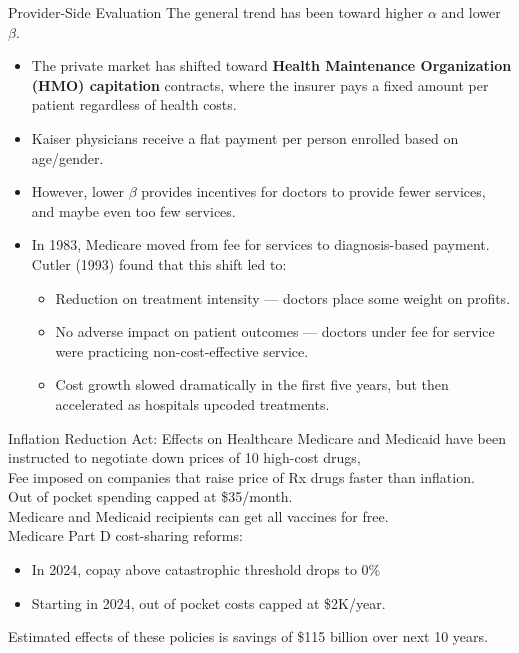\documentclass[8pt]{extarticle}
\begin{document}
\begin{problem}{Provider-Side Evaluation}
    The general trend has been toward higher $\alpha$ and lower $\beta$.
    \begin{itemize}
      \item The private market has shifted toward \textbf{Health Maintenance Organization (HMO) capitation} contracts, where the insurer pays a fixed amount per patient regardless of health costs.
      \item Kaiser physicians receive a flat payment per person enrolled based on age/gender.
      \item However, lower $\beta$ provides incentives for doctors to provide fewer services, and maybe even too few services.
      \item In 1983, Medicare moved from fee for services to diagnosis-based payment. Cutler (1993) found that this shift led to:
        \begin{itemize}
          \item Reduction on treatment intensity --- doctors place some weight on profits.
          \item No adverse impact on patient outcomes --- doctors under fee for service were practicing non-cost-effective service.
          \item Cost growth slowed dramatically in the first five years, but then accelerated as hospitals upcoded treatments.
        \end{itemize}
    \end{itemize}
  \end{problem}
  \begin{problem}{Inflation Reduction Act: Effects on Healthcare}
    Medicare and Medicaid have been instructed to negotiate down prices of 10 high-cost drugs,\\

    Fee imposed on companies that raise price of Rx drugs faster than inflation.\\

    Out of pocket spending capped at \$35/month.\\

    Medicare and Medicaid recipients can get all vaccines for free.\\

    Medicare Part D cost-sharing reforms:
    \begin{itemize}
      \item In 2024, copay above catastrophic threshold drops to 0\%
      \item Starting in 2024, out of pocket costs capped at \$2K/year.
    \end{itemize}
    Estimated effects of these policies is savings of \$115 billion over next 10 years.
  \end{problem}
\end{document}
